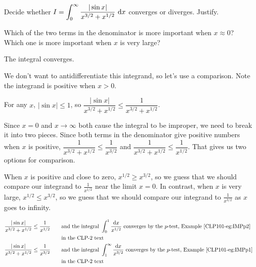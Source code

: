 \begin{question}[M121 1999A]
Decide whether
$I=\displaystyle\int_0^\infty\frac{|\sin x|}{x^{3/2}+x^{1/2}}\ \mathrm{d}x $
converges or diverges. Justify.
\end{question}

\begin{hint}
Which of the two terms in the denominator is more important when $x\approx
0$? Which one is more important when $x$ is very large?
\end{hint}

\begin{answer}
The integral converges.
\end{answer}

\begin{solution}
We don't want to antidifferentiate this integrand, so let's use a comparison. Note the integrand is positive when $x>0$.

For any $x$, $|\sin x| \leq 1$, so $\dfrac{|\sin x|}{x^{3/2}+x^{1/2}} \leq \dfrac{1}{x^{3/2}+x^{1/2}} $.


Since $x=0$ and $x \to \infty$ both cause the integral to be improper, we need to break it into two pieces.
Since both terms in the denominator give positive numbers when $x$ is positive, $\dfrac{1}{x^{3/2}+x^{1/2}} \leq \dfrac{1}{x^{3/2}}$ and $\dfrac{1}{x^{3/2}+x^{1/2}} \leq \dfrac{1}{x^{1/2}}$. That gives us two options for comparison.

When $x$ is positive and close to zero, $x^{1/2}  \ge x^{3/2}$, so we guess that we should compare our integrand to $\frac{1}{x^{1/2}}$ near the limit $x=0$. In contrast, when $x$ is very large, $x^{1/2}  \le x^{3/2}$, so we guess that we should compare our integrand to $\frac{1}{x^{3/2}}$ as $x$ goes to infinity.

\begin{alignat*}{3}
\frac{|\sin x|}{x^{3/2}+x^{1/2}}
&\le \frac{1}{x^{1/2}}
\quad&&\text{and the integral }\int_0^1\frac{\dee{x}}{x^{1/2}}\text{ converges
by the $p$-test,  Example \eref{CLP101}{eg:IMPp2}} \\
& && \text{in the CLP-2 text} \\
\frac{|\sin x|}{x^{3/2}+x^{1/2}}
&\le \frac{1}{x^{3/2}}
\quad&&\text{and the integral }\int_1^\infty\frac{\dee{x}}{x^{3/2}}\text{ converges
by the $p$-test, Example \eref{CLP101}{eg:IMPp1}} \\
& && \text{in the CLP-2 text}
\end{alignat*}


\end{solution}
